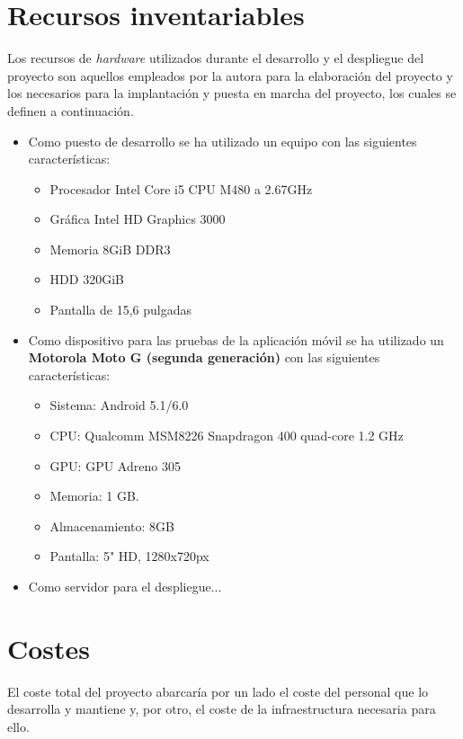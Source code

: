 \section{Recursos inventariables}

Los recursos de \textit{hardware} utilizados durante el desarrollo y el
despliegue del proyecto son aquellos empleados por la autora para la elaboración
del proyecto y los necesarios para la implantación y puesta en marcha del
proyecto, los cuales se definen a continuación.

\begin{itemize}
\item Como puesto de desarrollo se ha utilizado un equipo con las siguientes
  características:
  \begin{itemize}
  \item Procesador Intel Core i5 CPU M480 a 2.67GHz
  \item Gráfica Intel HD Graphics 3000
  \item Memoria 8GiB DDR3
  \item HDD 320GiB
  \item Pantalla de 15,6 pulgadas
  \end{itemize}

\item Como dispositivo para las pruebas de la aplicación móvil se ha utilizado
  un \textbf{Motorola Moto G (segunda generación)} con las siguientes
  características:

  \begin{itemize}
  \item Sistema: Android 5.1/6.0
  \item CPU: Qualcomm MSM8226 Snapdragon 400 quad-core 1.2 GHz
  \item GPU: GPU Adreno 305
  \item Memoria: 1 GB.
  \item Almacenamiento: 8GB
  \item Pantalla: 5" HD, 1280x720px
  \end{itemize}

\item Como servidor para el despliegue...
  
\end{itemize}


\section{Costes}
\label{sec:costes}

El coste total del proyecto abarcaría por un lado el coste del personal que
lo desarrolla y mantiene y, por otro, el coste de la infraestructura necesaria
para ello.

